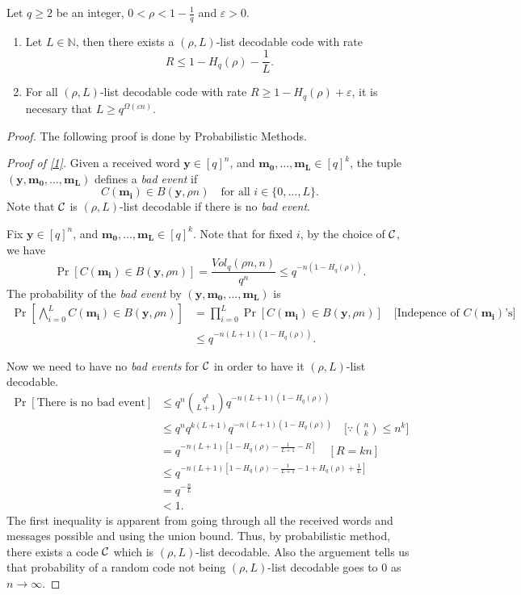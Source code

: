 	\begin{theorem}
		Let $q\geq2$ be an integer, $0<\rho<1-\frac{1}{q}$ and $\varepsilon>0$.
		\begin{enumerate}[1.]
			\item Let $L\in\mathbb{N}$, then there exists a $(\rho, L)$-list decodable code with rate 
			\[
			R \leq 1 - H_q(\rho) - \frac{1}{L}.
			\] \label{1}
			\item For all $(\rho, L)$-list decodable code with rate $R\geq 1 - H_q(\rho) + \varepsilon$, it is necesary that $L\geq q^{\Omega(\varepsilon n)}$.\label{2}
		\end{enumerate}
	\end{theorem}
	\begin{proof}
		The following proof is done by Probabilistic Methods. 
		
		\noindent\textit{Proof of \ref{1}.}
			Given a received word $\mathbf{y}\in[q]^n$, and $\mathbf{m_0}, \ldots, \mathbf{m_L}\in[q]^k$, the tuple $(\mathbf{y}, \mathbf{m_0}, \ldots, \mathbf{m_L})$ defines a \emph{bad event} if 
			\[
			C(\mathbf{m_i})\in B(\mathbf{y}, \rho n) \quad \text{for all $i\in\{0,\ldots,L\}$}.
			\]
			Note that $\mathcal{C}$ is $(\rho, L)$-list decodable if there is no \emph{bad event}. 
			
			Fix $\mathbf{y}\in[q]^n$, and $\mathbf{m_0}, \ldots, \mathbf{m_L}\in[q]^k$. Note that for fixed $i$, by the choice of $\mathcal{C}$, we have
			\[
			\Pr[C(\mathbf{m_i}) \in B(\mathbf{y}, \rho n)] = \frac{Vol_q(\rho n, n)}{q^n} \leq q^{-n(1 - H_q(\rho))}. 
			\]
			The probability of the \emph{bad event} by $(\mathbf{y}, \mathbf{m_0}, \ldots, \mathbf{m_L})$ is 
			\begin{align*}
				\Pr\left[\bigwedge_{i = 0}^L C(\mathbf{m_i})\in B(\mathbf{y}, \rho n)\right]  
				& =  \prod_{i = 0}^L \Pr[C(\mathbf{m_i})\in B(\mathbf{y}, \rho n)] \quad \text{[Indepence of $C(\mathbf{m_i})$'s]} \\
				& \leq q^{-n(L+1)(1 - H_q(\rho))}.
			\end{align*}
			
			Now we need to have no \emph{bad events} for $\mathcal{C}$ in order to have it $(\rho, L)$-list decodable.
			\begin{align*}
				\Pr[\text{There is no bad event}]
				& \leq q^n\binom{q^k}{L+1}q^{-n(L+1)(1 - H_q(\rho))} \\
				& \leq q^n q^{k(L+1)} q^{-n(L+1)(1 - H_q(\rho))} \quad \text{[$\because \binom{n}{k} \leq n^k$]}\\ 
				& = q^{-n(L+1)[1 - H_q(\rho) - \frac{1}{L+1} - R]} \quad [R = kn] \\
				& \leq q^{-n(L+1)[1 - H_q(\rho) -\frac{1}{L+1} -1 + H_q(\rho) + \frac{1}{L}]} \\
				& = q^{-\frac{n}{L}} \\
				& < 1.
			\end{align*}
			The first inequality is apparent from going through all the received words and messages possible and using the union bound. Thus, by probabilistic method, there exists a code $\mathcal{C}$ which is $(\rho, L)$-list decodable. Also the arguement tells us that probability of a random code not being $(\rho, L)$-list decodable goes to 0 as $n\to\infty$.
		

\end{proof}
